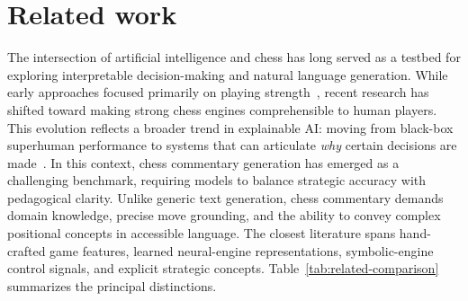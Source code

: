 \documentclass[sigconf,nonacm]{acmart}
\begin{document}
\section{Related work}
\label{sec:related-work}
The intersection of artificial intelligence and chess has long served as a testbed for exploring interpretable decision-making and natural language generation. While early approaches focused primarily on playing strength~\cite{deepblue,alphazero}, recent research has shifted toward making strong chess engines comprehensible to human players. This evolution reflects a broader trend in explainable AI: moving from black-box superhuman performance to systems that can articulate \textit{why} certain decisions are made~\cite{bjornsson2024chessxai}. In this context, chess commentary generation has emerged as a challenging benchmark, requiring models to balance strategic accuracy with pedagogical clarity. Unlike generic text generation, chess commentary demands domain knowledge, precise move grounding, and the ability to convey complex positional concepts in accessible language. The closest literature spans hand-crafted game features, learned neural-engine representations, symbolic-engine control signals, and explicit strategic concepts. Table~\ref{tab:related-comparison} summarizes the principal distinctions.
\end{document}
